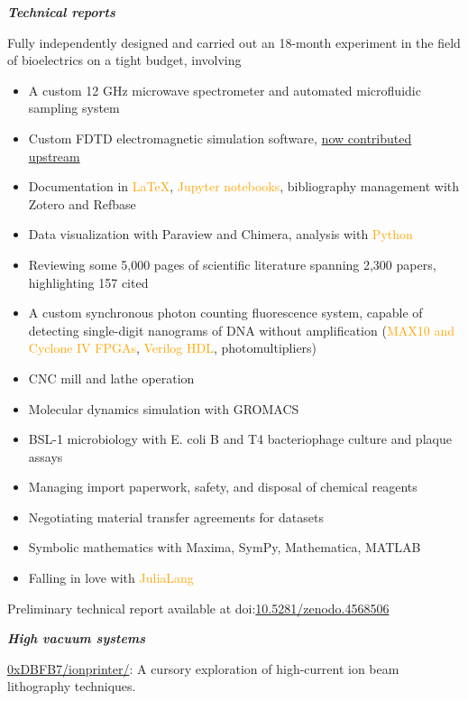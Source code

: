 \documentclass[fleqn,11pt]{article}
\newcommand{\ressection}[1]{\textbf{{\Large \textit{#1}}}\xrfill[0.1ex]{0.6pt}}
\newcommand{\sk}[1]{\textcolor{orange}{#1}}
\newcommand{\itemoptions}{\setlength{\itemindent}{-10pt} \setlength\itemsep{-1em}}
\begin{document}
\ressection{Technical reports}

Fully independently designed and carried out an 18-month experiment in the field of bioelectrics on a tight budget, involving
\begin{itemize}\itemoptions
\item A custom 12 GHz microwave spectrometer and automated microfluidic sampling system
\item Custom FDTD electromagnetic simulation software, \href{https://github.com/flaport/fdtd/pull/27}{now contributed upstream} 
\item Documentation in \sk{LaTeX}, \sk{Jupyter notebooks}, bibliography management with Zotero and Refbase
\item Data visualization with Paraview and Chimera, analysis with \sk{Python}
\item Reviewing some 5,000 pages of scientific literature spanning 2,300 papers, highlighting 157 cited
\item A custom synchronous photon counting fluorescence system, capable of detecting single-digit nanograms of DNA without amplification (\sk{MAX10 and Cyclone IV FPGAs}, \sk{Verilog HDL}, photomultipliers)
\item CNC mill and lathe operation
\item Molecular dynamics simulation with GROMACS
\item BSL-1 microbiology with E. coli B and T4 bacteriophage culture and plaque assays
\item Managing import paperwork, safety, and disposal of chemical reagents
\item Negotiating material transfer agreements for datasets
\item Symbolic mathematics with Maxima, SymPy, Mathematica, MATLAB
\item Falling in love with \sk{JuliaLang}
\end{itemize}

Preliminary technical report available at doi:\href{https://doi.org/10.5281/zenodo.4568506}{10.5281/zenodo.4568506}
\pagebreak

\ressection{High vacuum systems}

\href{https://github.com/0xDBFB7/ionprinter/}{0xDBFB7/ionprinter/}: A cursory exploration of high-current ion beam lithography techniques. 
\end{document}

